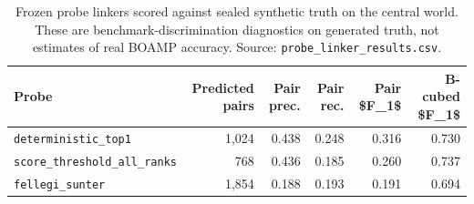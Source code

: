 \begin{table}[htbp]
\centering
\small
\caption{Frozen probe linkers scored against sealed synthetic truth on the central world. These are benchmark-discrimination diagnostics on generated truth, not estimates of real BOAMP accuracy. Source: \texttt{probe\_linker\_results.csv}.}
\label{tab:probes}
\begin{tabularx}{\textwidth}{>{\raggedright\arraybackslash}Xrrrrr}
\toprule
Probe & Predicted pairs & Pair prec. & Pair rec. & Pair \$F\_1\$ & B-cubed \$F\_1\$ \\
\midrule
\texttt{deterministic\_top1} & 1{,}024 & 0.438 & 0.248 & 0.316 & 0.730 \\
\texttt{score\_threshold\_all\_ranks} & 768 & 0.436 & 0.185 & 0.260 & 0.737 \\
\texttt{fellegi\_sunter} & 1{,}854 & 0.188 & 0.193 & 0.191 & 0.694 \\
\bottomrule
\end{tabularx}
\end{table}
